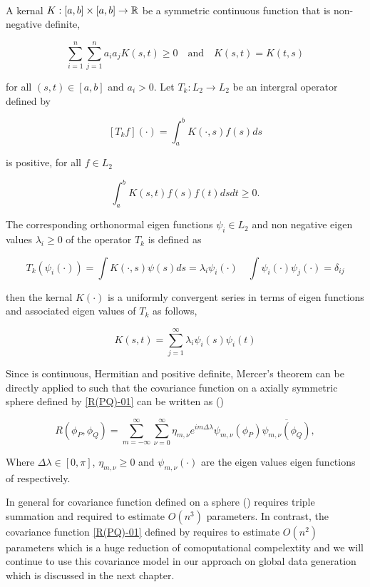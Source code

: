 		\begin{thm} \hfill \\
			
			A kernal $K:[a,b]\times [a,b] \to \mathbb{R}$ be a symmetric continuous function that is non-negative definite,
			
			\[
				\sum_{i=1}^{n}\sum_{j=1}^{n} a_i a_j K(s, t) \ge 0 \quad \mbox{and} \quad K(s,t) = K(t,s)
			\]
			
			for all $(s,t)\in [a,b]$ and $a_i>0$. Let $T_k:L_2 \to L_2$ be an intergral operator defined by
			
			\[
				[T_kf](\cdot) = \int_{a}^{b} K(\cdot,s)f(s)ds
			\]
			
			is positive, for all $f\in L_2$
			
			\[
				\int_{a}^{b} K(s, t)f(s)f(t)dsdt \ge 0.
			\]
			
			The corresponding orthonormal eigen functions $\psi_i\in L_2$ and non negative eigen values $\lambda_i \ge 0$ of the operator $T_k$ is defined as
			
			\[
				T_k(\psi_i(\cdot)) = \int K(\cdot, s)\psi(s)ds = \lambda_i\psi_i(\cdot) \quad \int \psi_i(\cdot)\psi_j(\cdot) = \delta_{ij}
			\]
			
			
			then the kernal $K(\cdot)$ is a uniformly convergent series in terms of eigen functions and associated eigen values of $T_k$ as follows,
			
			\[
				K(s,t) = \sum_{j=1}^{\infty} \lambda_i \psi_i(s)\psi_i(t) 
			\]
			
		\end{thm}
		
		Since \Cm is continuous, Hermitian and positive definite, Mercer's theorem can be directly applied to \Cm such that the covariance function on a axially symmetric sphere defined by \ref{R(PQ)-01} can be written as (\cite{Huang2012})
		
		\[
			R(\phi_P,\phi_Q) = \sum_{m=-\infty}^{\infty}\sum_{\nu=0}^{\infty} \eta_{m,\nu}e^{im\Delta\lambda}\psi_{m,\nu}(\phi_P)\overline{\psi_{m,\nu}(\phi_Q)},
		\]
		
		Where $\Delta\lambda \in [0, \pi]$, $\eta_{m,\nu}\ge 0$ and $\psi_{m,\nu}(\cdot)$ are the eigen values eigen functions of \Cm respectively.
		
		In general for covariance function defined on a sphere (\cite{Stein2007}) requires triple summation and required to estimate $O(n^3)$ parameters. In contrast, the covariance function \ref{R(PQ)-01} defined by \cite{Huang2012} requires to estimate $O(n^2)$ parameters which is a huge reduction of comoputational compelextity and we will continue to use this covariance model in our approach on global data generation which is discussed in the next chapter.
		
